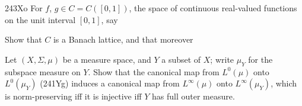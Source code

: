 {\vspheader{48pt}243Xo For $f$, $g\in C=C([0,1])$, the space of continuous 
real-valued functions on the unit interval $[0,1]$, say
     
     
     
\noindent Show that $C$ is a Banach lattice, and that moreover
     
     
     
     
 Let $(X,\Sigma,\mu)$ be a measure
space, and $Y$ a subset of
$X$;  write $\mu_Y$ for the subspace measure on $Y$.   Show that the
canonical map from $L^0(\mu)$ onto
$L^0(\mu_Y)$ (241Yg) induces a canonical map from
$L^{\infty}(\mu)$ onto $L^{\infty}(\mu_Y)$, which is norm-preserving iff
it is injective iff $Y$ has full outer measure.
     
}%
     
